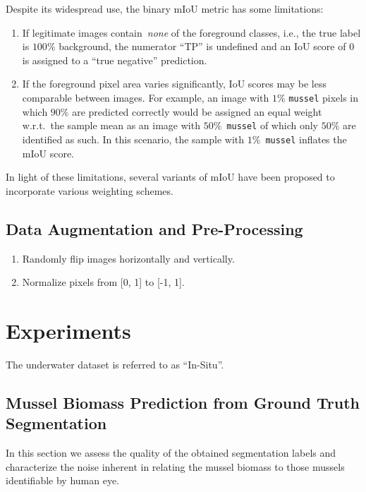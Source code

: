 \documentclass[11pt]{article} %
\begin{document}
Despite its widespread use, the binary mIoU metric has some limitations:

\begin{enumerate}
\item If legitimate images contain~\emph{none} of the foreground classes, i.e.,
the true label is $100\%$ background, the numerator ``TP'' is undefined and an
IoU score of 0 is assigned to a ``true negative'' prediction.

\item If the foreground pixel area varies significantly, IoU 
scores may be less comparable between images. For example, an image with $1\%$
\texttt{mussel} pixels in which $90\%$ are predicted correctly would be assigned
an equal weight w.r.t.~the sample mean as an image with $50\%$~\texttt{mussel}
of which only $50\%$ are identified as such. In this scenario, the sample with
$1\%$~\texttt{mussel} inflates the mIoU score.
\end{enumerate}

In light of these limitations, several variants of mIoU have been proposed to 
incorporate various weighting schemes.

\subsection{Data Augmentation and Pre-Processing}

\begin{enumerate}

\item Randomly flip images horizontally and vertically.

\item Normalize pixels from [0, 1] to [-1, 1].

\end{enumerate}

\section{Experiments}

The underwater dataset is referred to as ``In-Situ''.

\subsection{Mussel Biomass Prediction from Ground Truth Segmentation}

In this section we assess the quality of the obtained segmentation labels and
characterize the noise inherent in relating the mussel biomass to those mussels
identifiable by human eye.
\end{document}
